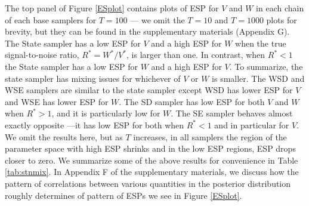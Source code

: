 \documentclass[12pt]{article}
\begin{document}
The top panel of Figure \ref{ESplot} contains plots of ESP for $V$ and $W$ in each chain of each base samplers for $T=100$ --- we omit the $T=10$ and $T=1000$ plots for brevity, but they can be found in the supplementary materials (Appendix G). The State sampler has a low ESP for $V$ and a high ESP for $W$ when the true signal-to-noise ratio, $R^*=W^*/V^*$, is larger than one. In contrast, when $R^*<1$ the State sampler has a low ESP for $W$ and a high ESP for $V$. To summarize, the state sampler has mixing issues for whichever of $V$ or $W$ is smaller. The WSD and WSE samplers are similar to the state sampler except WSD has lower ESP for $V$ and WSE has lower ESP for $W$. The SD sampler has low ESP for both $V$ and $W$ when $R^*>1$, and it is particularly low for $W$. The SE sampler behaves almost exactly opposite ---it has low ESP for both when $R^*<1$ and in particular for $V$. We omit the results here, but as $T$ increases, in all samplers the region of the parameter space with high ESP shrinks and in the low ESP regions, ESP drops closer to zero. We summarize some of the above results for convenience in Table \ref{tab:stnmix}. In Appendix F of the supplementary materials, we discuss how the pattern of correlations between various quantities in the posterior distribution roughly determines of pattern of ESPs we see in Figure \ref{ESplot}.
\end{document}
